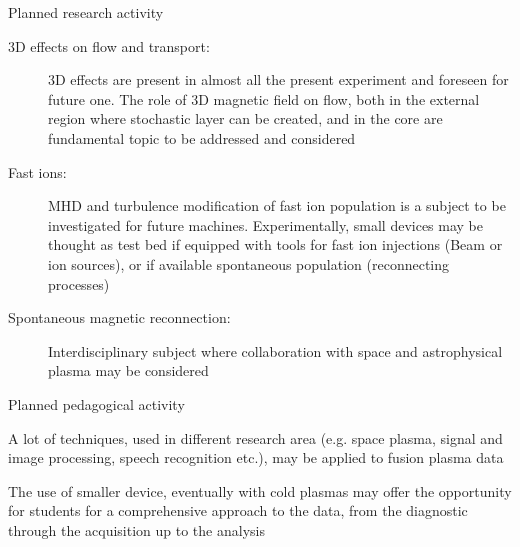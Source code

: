 \documentclass[t,10pt]{beamer}
\begin{document}
\begin{frame}{Planned research activity}
\begin{description}
\item[3D effects on flow and transport:] 3D effects are
  present in almost all the present experiment and foreseen for future
  one. The role of 3D magnetic field on flow, both in the external
  region where stochastic layer can be created, and in the core are
  fundamental topic to be addressed and considered
\item[Fast ions:] MHD and turbulence modification of fast ion
  population is a subject to be investigated for future
  machines. Experimentally, small devices may be thought as test bed
  if equipped with tools for fast ion injections (Beam or ion
  sources), or if available spontaneous population (reconnecting processes)
\item[Spontaneous magnetic reconnection:] Interdisciplinary subject
  where collaboration with space and astrophysical plasma may be considered 
\end{description}
\end{frame}

\begin{frame}{Planned pedagogical activity}
\begin{description}
{\large \item[Multidisciplinary approach to data analysis:] A lot of
  techniques, used in different research area (e.g. space plasma,
  signal and image processing, speech recognition etc.), may be applied to
  fusion plasma data}
{\large\item[Small fusion device as learning tools:] The use of smaller
  device, eventually with cold plasmas may offer the opportunity
  for students for a comprehensive approach to the data, from the
  diagnostic through the acquisition up to the analysis }
\end{description}
\end{frame}
\end{document}
